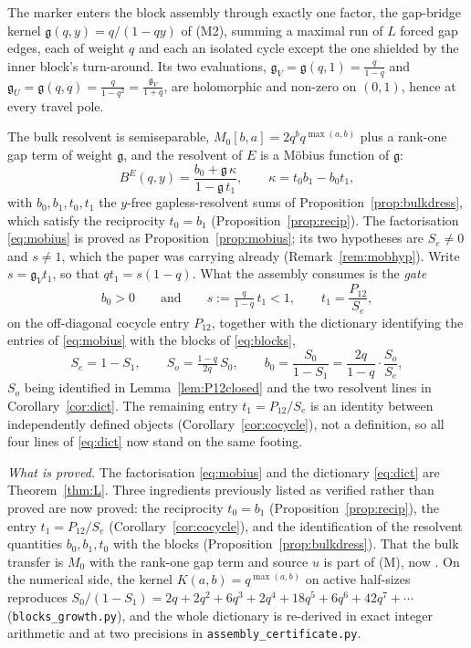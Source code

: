 \documentclass[11pt]{article}
\theoremstyle{plain}
\theoremstyle{definition}
\theoremstyle{remark}
\begin{document}
The marker enters the block assembly through exactly one factor, the gap-bridge kernel
$\mathfrak g(q,y)=q/(1-qy)$ of \textup{(M2)}, summing a maximal run of $L$ forced gap edges, each
of weight $q$ and each an isolated cycle except the one shielded by the inner block's turn-around.
Its two evaluations, $\mathfrak g_V=\mathfrak g(q,1)=\tfrac{q}{1-q}$ and
$\mathfrak g_U=\mathfrak g(q,q)=\tfrac{q}{1-q^2}=\tfrac{\mathfrak g_V}{1+q}$, are holomorphic and
non-zero on $(0,1)$, hence at every travel pole.

The bulk resolvent is semiseparable, $M_0[b,a]=2q^bq^{\max(a,b)}$ plus a rank-one gap term of
weight $\mathfrak g$, and the resolvent of $E$ is a M\"obius function of $\mathfrak g$:
\begin{equation}\label{eq:mobius}
   B^E(q,y)=\frac{b_0+\mathfrak g\,\kappa}{1-\mathfrak g\,t_1},\qquad \kappa=t_0b_1-b_0t_1,
\end{equation}
with $b_0,b_1,t_0,t_1$ the $y$-free gapless-resolvent sums of
Proposition~\ref{prop:bulkdress}, which satisfy the reciprocity $t_0=b_1$
(Proposition~\ref{prop:recip}). The factorisation \eqref{eq:mobius} is proved as
Proposition~\ref{prop:mobius}; its two hypotheses are $S_e\ne0$ and $s\ne1$, which the paper was
carrying already (Remark~\ref{rem:mobhyp}). Write $s=\mathfrak g_Vt_1$, so that $qt_1=s(1-q)$.
What the assembly consumes is the \emph{gate}
\begin{equation}\label{eq:gate}
   b_0>0\qquad\text{and}\qquad s:=\tfrac{q}{1-q}\,t_1<1,\qquad t_1=\frac{P_{12}}{S_e},
\end{equation}
on the off-diagonal cocycle entry $P_{12}$, together with the dictionary identifying the entries of
\eqref{eq:mobius} with the blocks of \eqref{eq:blocks},
\begin{equation}\label{eq:dict}
   S_e=1-S_1,\qquad S_o=\tfrac{1-q}{2q}\,S_0,\qquad
   b_0=\frac{S_0}{1-S_1}=\frac{2q}{1-q}\cdot\frac{S_o}{S_e},
\end{equation}
$S_o$ being identified in Lemma~\ref{lem:P12closed} and the two resolvent lines in
Corollary~\ref{cor:dict}. The remaining entry $t_1=P_{12}/S_e$ is an identity between
independently defined objects (Corollary~\ref{cor:cocycle}), not a definition, so all four lines
of \eqref{eq:dict} now stand on the same footing.

\emph{What is proved.} The factorisation \eqref{eq:mobius} and the dictionary \eqref{eq:dict} are
Theorem~\ref{thm:L}. Three ingredients previously listed as
verified rather than proved are now proved: the reciprocity $t_0=b_1$
(Proposition~\ref{prop:recip}), the entry $t_1=P_{12}/S_e$ (Corollary~\ref{cor:cocycle}), and the
identification of the resolvent quantities $b_0,b_1,t_0$ with the blocks
(Proposition~\ref{prop:bulkdress}). That the bulk transfer is $M_0$ with the rank-one gap term and
source $u$ is part of \textup{(M)}, now {\cite[Theorem ``the transfer model \textup{(M)}'', \textup{thm:model}]{Bonfioli2026bA}}. On the numerical side, the kernel
$K(a,b)=q^{\max(a,b)}$ on active half-sizes reproduces
$S_0/(1-S_1)=2q+2q^2+6q^3+2q^4+18q^5+6q^6+42q^7+\cdots$ (\texttt{blocks\_growth.py}), and the
whole dictionary is re-derived in exact integer arithmetic and at two precisions in
\texttt{assembly\_certificate.py}.
\end{document}
